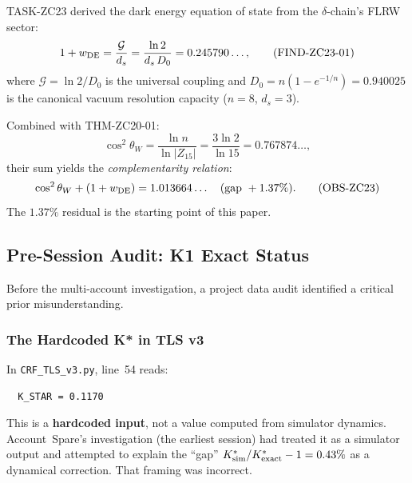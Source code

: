 \documentclass[12pt, a4paper]{article}
\begin{document}
TASK-ZC23 derived the dark energy equation of state from the
$\delta$-chain's FLRW sector:
\begin{equation}
  1 + w_{\rm DE} = \frac{\mathcal{G}}{d_s}
  = \frac{\ln 2}{d_s\,D_0}
  = 0.245790\ldots,
  \tag{FIND-ZC23-01}\label{zc24:eq:wDE}
\end{equation}
where $\mathcal{G} = \ln 2 / D_0$ is the universal coupling and
$D_0 = n(1-e^{-1/n}) = 0.940025$ is the canonical vacuum resolution
capacity ($n=8$, $d_s=3$).

Combined with THM-ZC20-01:
\begin{equation}
  \cos^2\theta_W = \frac{\ln n}{\ln|Z_{15}|} = \frac{3\ln 2}{\ln 15}
  = 0.767874\ldots,
  \tag{THM-ZC20-01}\label{zc24:eq:cos2W}
\end{equation}
their sum yields the \emph{complementarity relation}:
\begin{equation}
  \cos^2\theta_W + (1+w_{\rm DE}) = 1.013664\ldots
  \quad (\text{gap }+1.37\%).
  \tag{OBS-ZC23}\label{zc24:eq:comp}
\end{equation}
The $1.37\%$ residual is the starting point of this paper.

\subsection{Pre-Session Audit: K1 Exact Status}
\label{zc24:sec:k1}

Before the multi-account investigation, a project data audit
identified a critical prior misunderstanding.

\subsubsection{The Hardcoded K* in TLS v3}

\begin{formalbox}[title={Audit Finding: K\_STAR is an Input, not an Output}]
In \texttt{CRF\_TLS\_v3.py}, line~54 reads:
\begin{verbatim}
  K_STAR = 0.1170
\end{verbatim}
This is a \textbf{hardcoded input}, not a value computed from
simulator dynamics. Account~Spare's investigation (the earliest
session) had treated it as a simulator output and attempted to
explain the ``gap'' $K^*_{\rm sim}/K^*_{\rm exact} - 1 = 0.43\%$
as a dynamical correction. That framing was incorrect.
\end{formalbox}
\end{document}
